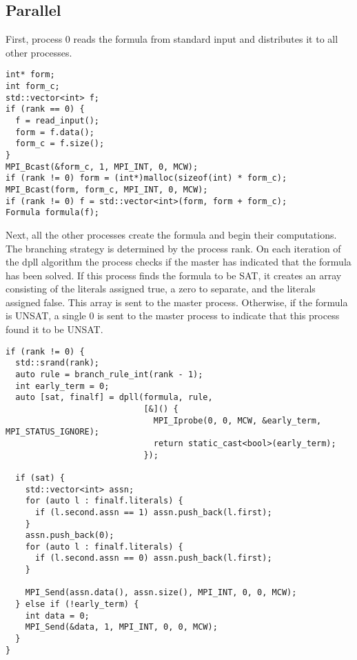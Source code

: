 \documentclass[10pt,AMS Euler]{article}
\begin{document}
\subsection{Parallel}
\label{sec:org807b379}
First, process 0 reads the formula from standard input and distributes it
to all other processes.
\begin{verbatim}
int* form;
int form_c;
std::vector<int> f;
if (rank == 0) {
  f = read_input();
  form = f.data();
  form_c = f.size();
}
MPI_Bcast(&form_c, 1, MPI_INT, 0, MCW);
if (rank != 0) form = (int*)malloc(sizeof(int) * form_c);
MPI_Bcast(form, form_c, MPI_INT, 0, MCW);
if (rank != 0) f = std::vector<int>(form, form + form_c);
Formula formula(f);
\end{verbatim}

Next, all the other processes create the formula and begin their computations.
The branching strategy is determined by the process rank. On each iteration
of the dpll algorithm the process checks if the master has indicated that the
formula has been solved. If this process finds the formula to be SAT, it creates
an array consisting of the literals assigned true, a zero to separate,
and the literals assigned false. This array is sent to the master process.
Otherwise, if the formula is UNSAT, a single 0 is sent to the master process to
indicate that this process found it to be UNSAT.
\begin{verbatim}
if (rank != 0) {
  std::srand(rank);
  auto rule = branch_rule_int(rank - 1);
  int early_term = 0;
  auto [sat, finalf] = dpll(formula, rule,
                            [&]() {
                              MPI_Iprobe(0, 0, MCW, &early_term, MPI_STATUS_IGNORE);
                              return static_cast<bool>(early_term);
                            });

  if (sat) {
    std::vector<int> assn;
    for (auto l : finalf.literals) {
      if (l.second.assn == 1) assn.push_back(l.first);
    }
    assn.push_back(0);
    for (auto l : finalf.literals) {
      if (l.second.assn == 0) assn.push_back(l.first);
    }

    MPI_Send(assn.data(), assn.size(), MPI_INT, 0, 0, MCW);
  } else if (!early_term) {
    int data = 0;
    MPI_Send(&data, 1, MPI_INT, 0, 0, MCW);
  }
}
\end{verbatim}
\end{document}
